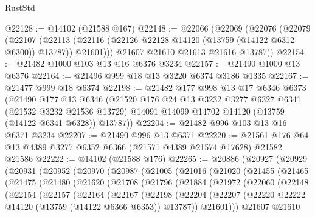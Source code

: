 \begin{lexlean}{RustStd}
\begin{coremodule}
@22128 := @14102 (@21588 @167)
@22148 := @22066
    (@22069
      (@22076
        (@22079
          (@22107
            (@22113 (@22116 (@22126 @22128 @14120 (@13759 (@14122 @6312 @6300)) @13787)) @21601)))
        @21607
        @21610
        @21613
        @21616
        @13787))
@22154 := @21482 @1000 @103 @13 @16 @6376 @3234
@22157 := @21490 @1000 @13 @6376
@22164 := @21496 @999 @18 @13 @3220 @6374 @3186 @1335
@22167 := @21477 @999 @18 @6374
@22198 := @21482
    @177
    @998
    @13
    @17
    @6346
    @6373
    (@21490
      @177
      @13
      @6346
      (@21520
        @176
        @24
        @13
        @3232
        @3277
        @6327
        @6341
        (@21532 @3232 @21536 @13729)
        @14091
        @14099
        @14702
        @14120
        (@13759 (@14122 @6341 @6328))
        @13787))
@22204 := @21482 @996 @103 @13 @16 @6371 @3234
@22207 := @21490 @996 @13 @6371
@22220 := @21561 @176 @64 @13 @4389 @3277 @6352 @6366 (@21571 @4389 @21574 @17628) @21582 @21586
@22222 := @14102 (@21588 @176)
@22265 := @20886
    (@20927
      (@20929
        (@20931
          (@20952
            (@20970
              (@20987
                (@21005
                  (@21016
                    (@21020
                      (@21455
                        (@21465
                          (@21475
                            (@21480
                              (@21620
                                (@21708
                                  (@21796
                                    (@21884
                                      (@21972
                                        (@22060
                                          (@22148
                                            (@22154
                                              (@22157
                                                (@22164
                                                  (@22167
                                                    (@22198
                                                      (@22204
                                                        (@22207
                                                          (@22220
                                                            @22222
                                                            @14120
                                                            (@13759 (@14122 @6366 @6353))
                                                            @13787))
                                                        @21601)))
                                                  @21607
                                                  @21610

\end{coremodule}
\end{lexlean}
